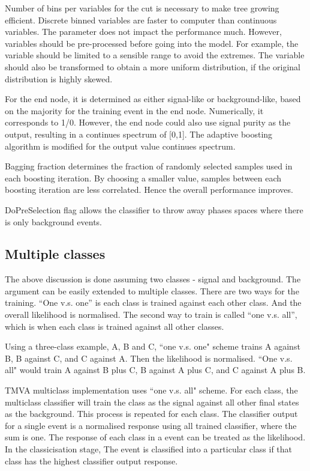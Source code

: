 Number of bins per variables for the cut is necessary to make tree growing efficient. Discrete binned variables are faster to computer than continuous variables. The parameter does not impact the performance much. However, variables should be pre-processed before going into the model. For example, the variable should be limited to a sensible range to avoid the extremes. The variable should also be transformed to obtain a more uniform distribution, if the original distribution is highly skewed.

For the end node, it is determined as either signal-like or background-like, based on the majority for the training event in the end node. Numerically, it corresponds to 1/0. However, the end node could also use signal purity as the output, resulting in a continues spectrum of [0,1]. The adaptive boosting algorithm is modified for the output value continues spectrum.

Bagging fraction determines the fraction of randomly selected samples used in each boosting iteration. By choosing a smaller value, samples between each boosting iteration are less correlated. Hence the overall performance improves.

DoPreSelection flag allows the classifier to throw away phases spaces where there is only background events.

\subsection{Multiple classes}
\label{sec:pandoraMVAmulticlass}

The above discussion is done assuming two classes - signal and background. The argument can be easily extended to multiple classes. There are two ways for the training. ``One v.s. one'' is each class is trained against each other class. And the overall likelihood is normalised. The second way to train is called ``one v.s. all'', which is when each class is trained against all other classes.

Using a three-class example, A, B and C, ``one v.s. one" scheme trains A against B, B against C, and C against A. Then the likelihood is normalised. ``One v.s. all" would train A against B plus C, B against A plus C, and C against A plus B.

TMVA multiclass implementation uses ``one v.s. all" scheme. For each class, the multiclass classifier will train the class as the signal against all other final states as the background. This process is repeated for each class. The classifier output for a single event is a normalised response using all trained classifier, where the sum is one. The response of each class in a event can be treated as the likelihood. In the classicisation stage, The event is classified into a particular class if that class has the highest classifier output response.

